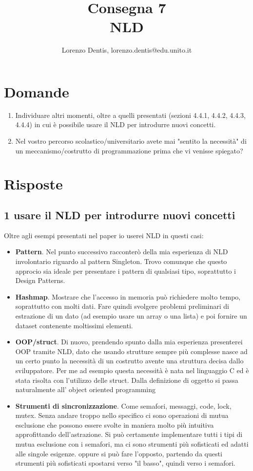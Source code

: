 \documentclass[a4paper]{article}
\begin{document}
\author{Lorenzo Dentis, lorenzo.dentis@edu.unito.it}
\title{Consegna 7 \\ \large NLD}
\maketitle

\section{Domande}
\begin{enumerate}
	\item Individuare altri momenti, oltre a quelli presentati (sezioni 4.4.1, 4.4.2, 4.4.3, 4.4.4) in cui è possibile usare il NLD per introdurre nuovi concetti.
	\item Nel vostro percorso scolastico/universitario avete mai "sentito la necessità" di un meccanismo/costrutto di programmazione prima che vi venisse spiegato? 
\end{enumerate}
\section{Risposte}
\subsection{1 usare il NLD per introdurre nuovi concetti}
Oltre agli esempi presentati nel paper \cite{NLD} io userei NLD in questi casi:
\begin{itemize}
	\item \textbf{Pattern}. Nel punto successivo racconterò della mia esperienza di NLD involontario riguardo al pattern Singleton. Trovo comunque che questo approcio sia ideale per presentare i pattern di qualsiasi tipo, soprattutto i Design Patterns.
	\item \textbf{Hashmap}. Mostrare che l'accesso in memoria può richiedere molto tempo, soprattutto con molti dati. Fare quindi svolgere problemi preliminari di estrazione di un dato (ad esempio usare un array o una lista) e poi fornire un dataset contenente moltissimi elementi.
	\item \textbf{OOP/struct}. Di nuovo, prendendo spunto dalla mia esperienza presenterei OOP tramite NLD, dato che usando strutture sempre più complesse nasce ad un certo punto la necessità di un costrutto avente una struttura decisa dallo sviluppatore. Per me ad esempio questa necessità è nata nel linguaggio C ed è stata risolta con l'utilizzo delle struct. Dalla definizione di oggetto si passa naturalmente all' object oriented programming
	\item \textbf{Strumenti di sincronizzazione}. Come semafori, messaggi, code, lock, mutex. Senza andare troppo nello specifico ci sono operazioni di mutua esclusione che possono essere svolte in maniera molto più intuitiva approfittando dell'astrazione. Si può certamente implementare tutti i tipi di mutua esclusione con i semafori, ma ci sono strumenti più sofisticati ed adatti alle singole esigenze. oppure si può fare l'opposto, partendo da questi strumenti più sofisticati spostarsi verso "il basso", quindi verso i semafori.
\end{itemize}
\end{document}
